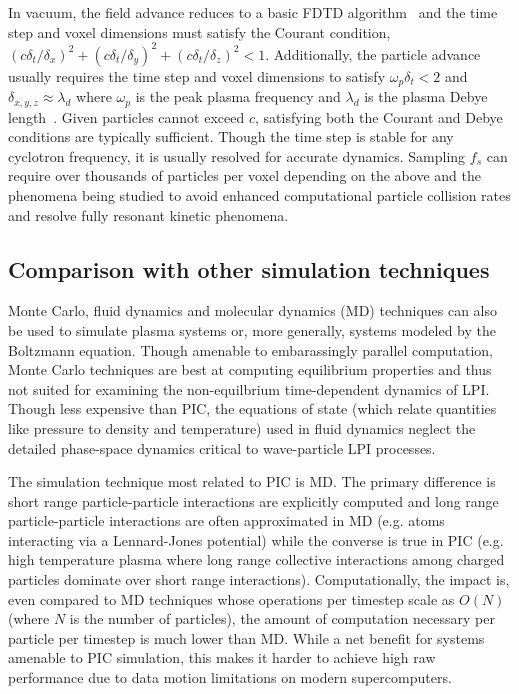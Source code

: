 \documentclass[journal,twoside]{IEEEtran}
\begin{document}
In vacuum, the field advance reduces to a basic FDTD
algorithm~\cite{Yee_1966} and the time step and voxel dimensions must
satisfy the Courant condition, $\left(c\delta_t/\delta_x\right)^2 +
\left(c\delta_t/\delta_y\right)^2 + \left(c\delta_t/\delta_z\right)^2
< 1$.  Additionally, the particle advance usually requires the time
step and voxel dimensions to satisfy $\omega_p \delta_t < 2$ and
$\delta_{x,y,z} \approx \lambda_d$ where $\omega_p$ is the peak plasma
frequency and $\lambda_d$ is the plasma Debye
length~\cite{Birdsall_Langdon_1985,Hockney_Eastwood_1988}.  Given
particles cannot exceed $c$, satisfying both the Courant and Debye
conditions are typically sufficient.  Though the time step is stable
for any cyclotron frequency, it is usually resolved for accurate
dynamics.  Sampling $f_s$ can require over thousands of particles per
voxel depending on the above and the phenomena being studied to avoid
enhanced computational particle collision rates and resolve fully
resonant kinetic phenomena.

\subsection{Comparison with other simulation techniques}

Monte Carlo, fluid dynamics and molecular dynamics (MD) techniques can
also be used to simulate plasma systems or, more generally, systems
modeled by the Boltzmann equation.  Though amenable to embarassingly
parallel computation, Monte Carlo techniques are best at computing
equilibrium properties and thus not suited for examining the
non-equilbrium time-dependent dynamics of LPI.  Though less expensive
than PIC, the equations of state (which relate quantities like
pressure to density and temperature) used in fluid dynamics neglect
the detailed phase-space dynamics critical to wave-particle LPI
processes.

The simulation technique most related to PIC is MD.  The primary
difference is short range particle-particle interactions are
explicitly computed and long range particle-particle interactions are
often approximated in MD (e.g. atoms interacting via a Lennard-Jones
potential) while the converse is true in PIC (e.g. high temperature
plasma where long range collective interactions among charged
particles dominate over short range interactions).  Computationally,
the impact is, even compared to MD techniques whose operations per
timestep scale as $O(N)$ (where $N$ is the number of particles), the
amount of computation necessary per particle per timestep is much
lower than MD.  While a net benefit for systems amenable to PIC
simulation, this makes it harder to achieve high raw performance due
to data motion limitations on modern supercomputers.
\end{document}
